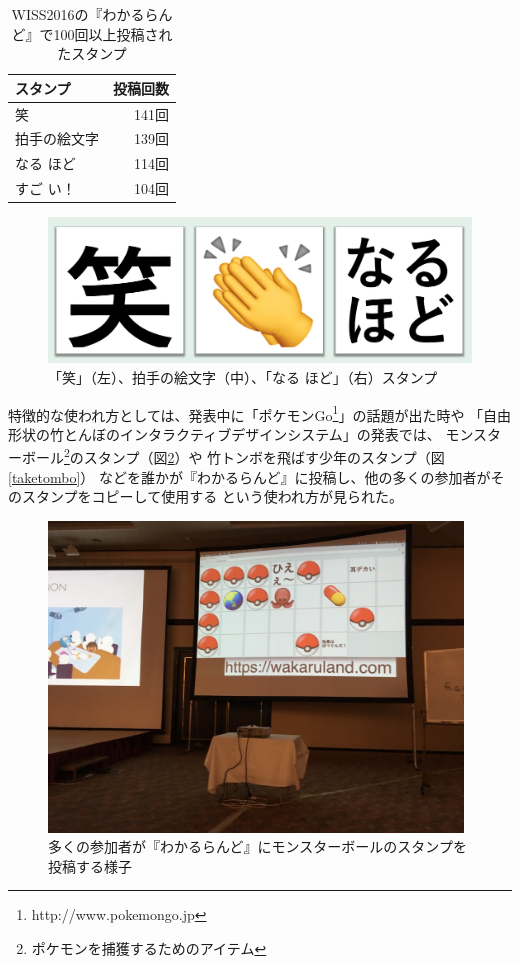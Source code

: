 \begin{table}[H]
  \begin{center}
    \caption{WISS2016の『わかるらんど』で100回以上投稿されたスタンプ}
    \label{tb:wiss2016stamp}
    \begin{tabular}{|l|r|} \hline
      スタンプ     & 投稿回数 \\ \hline \hline
      笑           & 141回 \\ \hline
      拍手の絵文字 & 139回 \\ \hline
      なる ほど    & 114回 \\ \hline
      すご い！    & 104回 \\ \hline
    \end{tabular}
  \end{center}
\end{table}

\begin{figure}[H]
\centering
\includegraphics[width=12cm]{images/wiss_top3.png}
\caption{「笑」（左）、拍手の絵文字（中）、「なる ほど」（右）スタンプ}
\label{wiss_top3}
\end{figure}

特徴的な使われ方としては、発表中に「ポケモンGo\footnote{http://www.pokemongo.jp}」の話題が出た時や
「自由形状の竹とんぼのインタラクティブデザインシステム」の発表では、
モンスターボール\footnote{ポケモンを捕獲するためのアイテム}のスタンプ（図\ref{pokemon}）や
竹トンボを飛ばす少年のスタンプ（図\ref{taketombo}）
などを誰かが『わかるらんど』に投稿し、他の多くの参加者がそのスタンプをコピーして使用する
という使われ方が見られた。

\begin{figure}[H]
\centering
\includegraphics[width=11cm]{images/pokemon.png}
\caption{多くの参加者が『わかるらんど』にモンスターボールのスタンプを投稿する様子}
\label{pokemon}
\end{figure}

